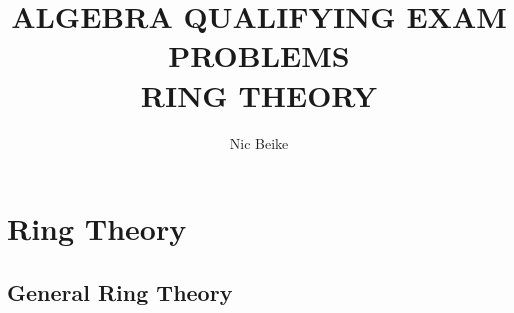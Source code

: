 \documentclass{article}
\title{ALGEBRA QUALIFYING EXAM PROBLEMS \\ RING THEORY}
\author{Nic Beike}
\theoremstyle{definition}
\begin{document}
\maketitle

\newpage

\tableofcontents

\newpage




\section{Ring Theory}

    \begin{enumerate}    

        \subsection{General Ring Theory}


\end{enumerate}
\end{document}
